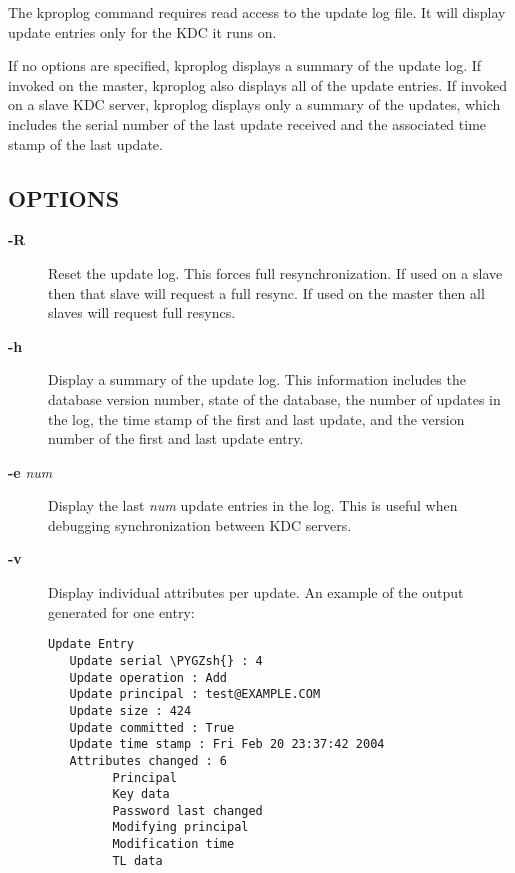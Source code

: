\documentclass[letterpaper,10pt,english]{sphinxmanual}
\def\PYGZsh{\char`\#}
\begin{document}
The kproplog command requires read access to the update log file.  It
will display update entries only for the KDC it runs on.

If no options are specified, kproplog displays a summary of the update
log.  If invoked on the master, kproplog also displays all of the
update entries.  If invoked on a slave KDC server, kproplog displays
only a summary of the updates, which includes the serial number of the
last update received and the associated time stamp of the last update.


\subsection{OPTIONS}
\label{admin/admin_commands/kproplog:options}\begin{description}
\item[{\textbf{-R}}] \leavevmode
Reset the update log.  This forces full resynchronization.  If used
on a slave then that slave will request a full resync.  If used on
the master then all slaves will request full resyncs.

\item[{\textbf{-h}}] \leavevmode
Display a summary of the update log.  This information includes
the database version number, state of the database, the number of
updates in the log, the time stamp of the first and last update,
and the version number of the first and last update entry.

\item[{\textbf{-e} \emph{num}}] \leavevmode
Display the last \emph{num} update entries in the log.  This is useful
when debugging synchronization between KDC servers.

\item[{\textbf{-v}}] \leavevmode
Display individual attributes per update.  An example of the
output generated for one entry:

\begin{Verbatim}[commandchars=\\\{\}]
Update Entry
   Update serial \PYGZsh{} : 4
   Update operation : Add
   Update principal : test@EXAMPLE.COM
   Update size : 424
   Update committed : True
   Update time stamp : Fri Feb 20 23:37:42 2004
   Attributes changed : 6
         Principal
         Key data
         Password last changed
         Modifying principal
         Modification time
         TL data
\end{Verbatim}

\end{description}
\end{document}
